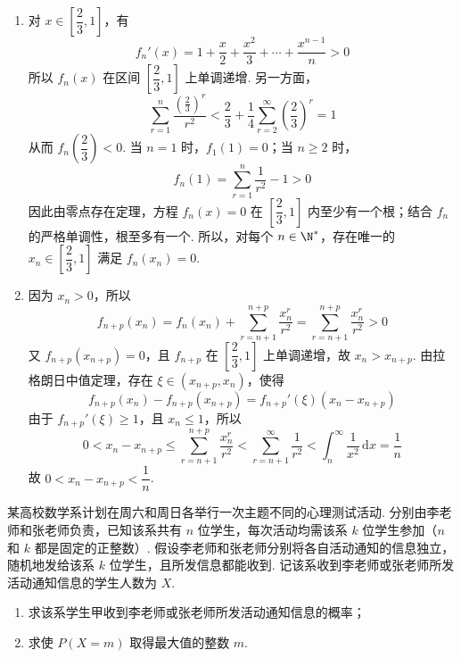 \begin{solution}
\begin{enumerate}
\item 对 \(x\in\left[\dfrac{2}{3},1\right]\)，有
\[
f_n'(x)=1+\frac{x}{2}+\frac{x^2}{3}+\cdots+\frac{x^{n-1}}{n}>0
\]
所以 \(f_n(x)\) 在区间 \(\left[\dfrac{2}{3},1\right]\) 上单调递增. 另一方面，
\[
\sum_{r=1}^{n}\frac{(\frac{2}{3})^r}{r^2}
<\frac{2}{3}+\frac{1}{4}\sum_{r=2}^{\infty}\left(\frac{2}{3}\right)^r
=1
\]
从而 \(f_n\left(\dfrac{2}{3}\right)<0\). 当 \(n=1\) 时，\(f_1(1)=0\)；当 \(n\geqslant2\) 时，
\[
f_n(1)=\sum_{r=1}^{n}\frac{1}{r^2}-1>0
\]
因此由零点存在定理，方程 \(f_n(x)=0\) 在 \(\left[\dfrac{2}{3},1\right]\) 内至少有一个根；结合 \(f_n\) 的严格单调性，根至多有一个. 所以，对每个 \(n\in\N^*\)，存在唯一的 \(x_n\in\left[\dfrac{2}{3},1\right]\) 满足 \(f_n(x_n)=0\).

\item 因为 \(x_n>0\)，所以
\[
f_{n+p}(x_n)=f_n(x_n)+\sum_{r=n+1}^{n+p}\frac{x_n^r}{r^2}
=\sum_{r=n+1}^{n+p}\frac{x_n^r}{r^2}>0
\]
又 \(f_{n+p}(x_{n+p})=0\)，且 \(f_{n+p}\) 在 \(\left[\dfrac{2}{3},1\right]\) 上单调递增，故 \(x_n>x_{n+p}\). 由拉格朗日中值定理，存在 \(\xi\in(x_{n+p},x_n)\)，使得
\[
f_{n+p}(x_n)-f_{n+p}(x_{n+p})=f_{n+p}'(\xi)(x_n-x_{n+p})
\]
由于 \(f_{n+p}'(\xi)\geqslant1\)，且 \(x_n\leqslant1\)，所以
\[
0<x_n-x_{n+p}\leqslant\sum_{r=n+1}^{n+p}\frac{x_n^r}{r^2}
<\sum_{r=n+1}^{\infty}\frac{1}{r^2}
<\int_n^{\infty}\frac{1}{x^2}\,\mathrm{d}x=\frac{1}{n}
\]
故 \(0<x_n-x_{n+p}<\dfrac{1}{n}\).
\end{enumerate}
\end{solution}

\begin{problem}
某高校数学系计划在周六和周日各举行一次主题不同的心理测试活动. 分别由李老师和张老师负责，已知该系共有 \(n\) 位学生，每次活动均需该系 \(k\) 位学生参加（\(n\) 和 \(k\) 都是固定的正整数）. 假设李老师和张老师分别将各自活动通知的信息独立，随机地发给该系 \(k\) 位学生，且所发信息都能收到. 记该系收到李老师或张老师所发活动通知信息的学生人数为 \(X\).
\begin{enumerate}
\item 求该系学生甲收到李老师或张老师所发活动通知信息的概率；
\item 求使 \(P(X = m)\) 取得最大值的整数 \(m\).
\end{enumerate}
\end{problem}

